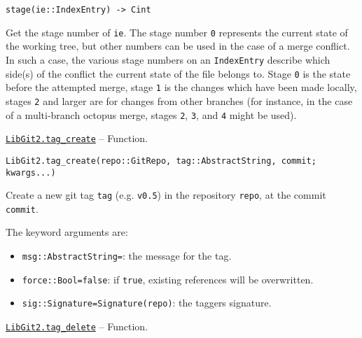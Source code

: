 \begin{adjustwidth}{2em}{0pt}


\begin{verbatim}
stage(ie::IndexEntry) -> Cint
\end{verbatim}

Get the stage number of \texttt{ie}. The stage number \texttt{0} represents the current state of the working tree, but other numbers can be used in the case of a merge conflict. In such a case, the various stage numbers on an \texttt{IndexEntry} describe which side(s) of the conflict the current state of the file belongs to. Stage \texttt{0} is the state before the attempted merge, stage \texttt{1} is the changes which have been made locally, stages \texttt{2} and larger are for changes from other branches (for instance, in the case of a multi-branch {\textquotedbl}octopus{\textquotedbl} merge, stages \texttt{2}, \texttt{3}, and \texttt{4} might be used).



\end{adjustwidth}
\hypertarget{4898692620083276733}{} 
\hyperlink{4898692620083276733}{\texttt{LibGit2.tag\_create}}  -- {Function.}

\begin{adjustwidth}{2em}{0pt}


\begin{verbatim}
LibGit2.tag_create(repo::GitRepo, tag::AbstractString, commit; kwargs...)
\end{verbatim}

Create a new git tag \texttt{tag} (e.g. \texttt{{\textquotedbl}v0.5{\textquotedbl}}) in the repository \texttt{repo}, at the commit \texttt{commit}.

The keyword arguments are:

\begin{itemize}
\item \texttt{msg::AbstractString={\textquotedbl}{\textquotedbl}}: the message for the tag.


\item \texttt{force::Bool=false}: if \texttt{true}, existing references will be overwritten.


\item \texttt{sig::Signature=Signature(repo)}: the tagger{\textquotesingle}s signature.

\end{itemize}


\end{adjustwidth}
\hypertarget{7680948887680773639}{} 
\hyperlink{7680948887680773639}{\texttt{LibGit2.tag\_delete}}  -- {Function.}

